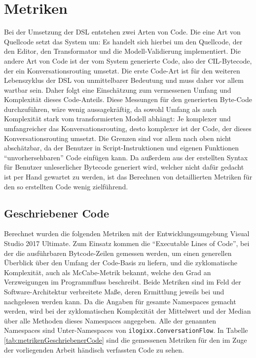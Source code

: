 \section{Metriken}
Bei der Umsetzung der DSL entstehen zwei Arten von Code. Die eine Art von Quellcode setzt das System um: Es handelt sich hierbei um den Quellcode, der den Editor, den Transformator und die Modell-Validierung implementiert. Die andere Art von Code ist der vom System generierte Code, also der CIL-Bytecode, der ein Konversationsrouting umsetzt. Die erste Code-Art ist für den weiteren Lebenszyklus der DSL von unmittelbarer Bedeutung und muss daher vor allem wartbar sein. Daher folgt eine Einschätzung zum vermessenen Umfang und Komplexität dieses Code-Anteils. Diese Messungen für den generierten Byte-Code durchzuführen, wäre  wenig aussagekräftig, da sowohl Umfang als auch Komplexität stark vom transformierten Modell abhängt: Je komplexer und umfangreicher das Konversationsrouting, desto komplexer ist der Code, der dieses Konversationsrouting umsetzt. Die Grenzen sind vor allem nach oben nicht abschätzbar, da der Benutzer in Script-Instruktionen und eigenen Funktionen ``unvorhersehbaren'' Code einfügen kann. Da außerdem aus der erstellten Syntax für Benutzer unleserlicher Bytecode generiert wird, welcher nicht dafür gedacht ist per Hand gewartet zu werden, ist das Berechnen von detaillierten Metriken für den so erstellten Code wenig zielführend. 

\subsection{Geschriebener Code}
Berechnet wurden die folgenden Metriken mit der Entwicklungsumgebung Visual Studio 2017 Ultimate. Zum Einsatz kommen die ``Executable Lines of Code'', bei der die ausführbaren Bytcode-Zeilen gemessen werden, um einen generellen Überblick über den Umfang der Code-Basis zu liefern, und die zyklomatische Komplexität, auch als McCabe-Metrik bekannt, welche den Grad an Verzweigungen im Programmfluss beschreibt. Beide Metriken sind im Feld der Software-Architektur verbreitete Maße, deren Ermittlung jeweils bei \cite[S. 35ff]{Laird:06} und \cite[S. 58ff]{Laird:06} nachgelesen werden kann. Da die Angaben für gesamte Namespaces gemacht werden, wird bei der zyklomatischen Komplexität der Mittelwert und der Median über alle Methoden dieses Namespaces angegeben. Alle der genannten Namespaces sind Unter-Namespaces von \texttt{ilogixx.ConversationFlow}. In Tabelle \ref{tab:metrikenGeschriebenerCode} sind die gemessenen Metriken für den im Zuge der vorliegenden Arbeit händisch verfassten Code zu sehen.

